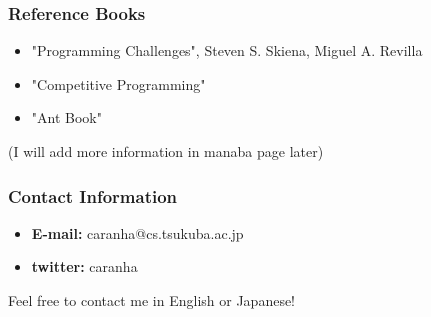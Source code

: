 \documentclass{beamer}
\begin{document}
\begin{frame}
    \frametitle{Reference Books}
    \begin{itemize}
        \item "Programming Challenges", Steven S. Skiena, Miguel A. Revilla
        \item "Competitive Programming"
        \item "Ant Book"
    \end{itemize}

    (I will add more information in manaba page later)

\end{frame}

\begin{frame}
    \frametitle{Contact Information}
    \begin{itemize}
    \item {\bf E-mail:} caranha@cs.tsukuba.ac.jp
    \item {\bf twitter:} caranha
    \end{itemize}

    \bigskip
    
    Feel free to contact me in English or Japanese!    
\end{frame}
\end{document}
